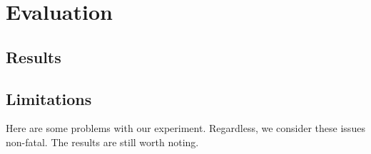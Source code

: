 \section{Evaluation}
\label{evaluation}


\subsection{Results}

\subsection{Limitations}
Here are some problems with our experiment.
Regardless, we consider these issues non-fatal. 
The results are still worth noting.
